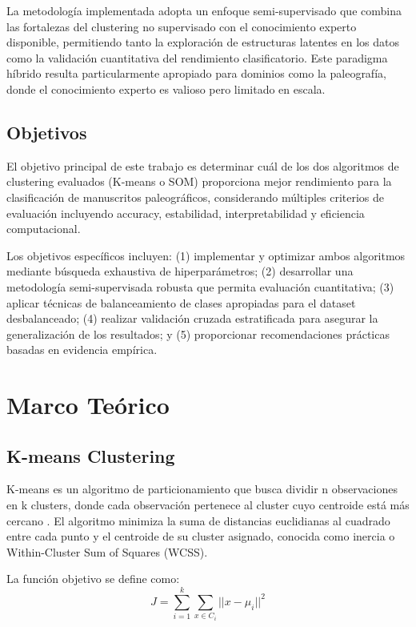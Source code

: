 \documentclass[12pt,a4paper]{article}
\begin{document}
La metodología implementada adopta un enfoque semi-supervisado que combina las fortalezas del clustering no supervisado con el conocimiento experto disponible, permitiendo tanto la exploración de estructuras latentes en los datos como la validación cuantitativa del rendimiento clasificatorio. Este paradigma híbrido resulta particularmente apropiado para dominios como la paleografía, donde el conocimiento experto es valioso pero limitado en escala.

\subsection{Objetivos}

El objetivo principal de este trabajo es determinar cuál de los dos algoritmos de clustering evaluados (K-means o SOM) proporciona mejor rendimiento para la clasificación de manuscritos paleográficos, considerando múltiples criterios de evaluación incluyendo accuracy, estabilidad, interpretabilidad y eficiencia computacional.

Los objetivos específicos incluyen: (1) implementar y optimizar ambos algoritmos mediante búsqueda exhaustiva de hiperparámetros; (2) desarrollar una metodología semi-supervisada robusta que permita evaluación cuantitativa; (3) aplicar técnicas de balanceamiento de clases apropiadas para el dataset desbalanceado; (4) realizar validación cruzada estratificada para asegurar la generalización de los resultados; y (5) proporcionar recomendaciones prácticas basadas en evidencia empírica.

\section{Marco Teórico}

\subsection{K-means Clustering}

K-means es un algoritmo de particionamiento que busca dividir n observaciones en k clusters, donde cada observación pertenece al cluster cuyo centroide está más cercano \cite{macqueen1967}. El algoritmo minimiza la suma de distancias euclidianas al cuadrado entre cada punto y el centroide de su cluster asignado, conocida como inercia o Within-Cluster Sum of Squares (WCSS).

La función objetivo se define como:
\begin{equation}
J = \sum_{i=1}^{k} \sum_{x \in C_i} ||x - \mu_i||^2
\end{equation}
\end{document}
